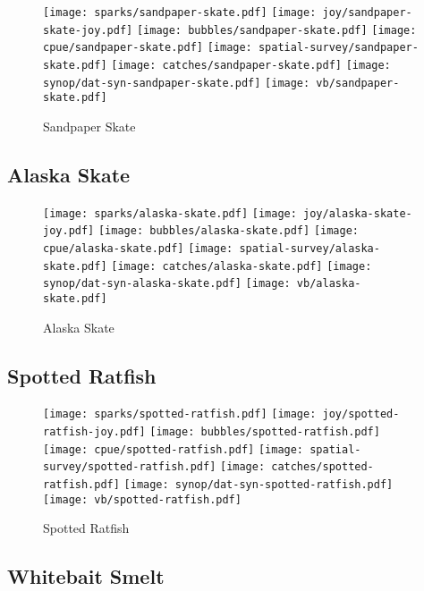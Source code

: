 \begin{figure}[htbp]
\centering
\texttt{[image: sparks/sandpaper-skate.pdf]}
\texttt{[image: joy/sandpaper-skate-joy.pdf]}
\texttt{[image: bubbles/sandpaper-skate.pdf]}
\texttt{[image: cpue/sandpaper-skate.pdf]}
\texttt{[image: spatial-survey/sandpaper-skate.pdf]}
\texttt{[image: catches/sandpaper-skate.pdf]}
\texttt{[image: synop/dat-syn-sandpaper-skate.pdf]}
\texttt{[image: vb/sandpaper-skate.pdf]}
\caption{Sandpaper Skate}
\end{figure}
\clearpage
\subsection*{Alaska Skate}

\begin{figure}[htbp]
\centering
\texttt{[image: sparks/alaska-skate.pdf]}
\texttt{[image: joy/alaska-skate-joy.pdf]}
\texttt{[image: bubbles/alaska-skate.pdf]}
\texttt{[image: cpue/alaska-skate.pdf]}
\texttt{[image: spatial-survey/alaska-skate.pdf]}
\texttt{[image: catches/alaska-skate.pdf]}
\texttt{[image: synop/dat-syn-alaska-skate.pdf]}
\texttt{[image: vb/alaska-skate.pdf]}
\caption{Alaska Skate}
\end{figure}
\clearpage
\subsection*{Spotted Ratfish}

\begin{figure}[htbp]
\centering
\texttt{[image: sparks/spotted-ratfish.pdf]}
\texttt{[image: joy/spotted-ratfish-joy.pdf]}
\texttt{[image: bubbles/spotted-ratfish.pdf]}
\texttt{[image: cpue/spotted-ratfish.pdf]}
\texttt{[image: spatial-survey/spotted-ratfish.pdf]}
\texttt{[image: catches/spotted-ratfish.pdf]}
\texttt{[image: synop/dat-syn-spotted-ratfish.pdf]}
\texttt{[image: vb/spotted-ratfish.pdf]}
\caption{Spotted Ratfish}
\end{figure}
\clearpage
\subsection*{Whitebait Smelt}

